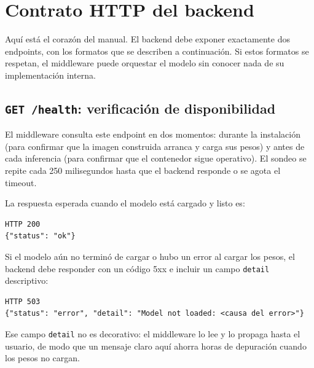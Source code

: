 \documentclass[12pt,a4paper]{article}
\begin{document}
\section{Contrato HTTP del backend}

Aquí está el corazón del manual. El backend debe exponer exactamente dos endpoints, con los formatos que se describen a continuación. Si estos formatos se respetan, el middleware puede orquestar el modelo sin conocer nada de su implementación interna.

\subsection{\texttt{GET /health}: verificación de disponibilidad}

El middleware consulta este endpoint en dos momentos: durante la instalación (para confirmar que la imagen construida arranca y carga sus pesos) y antes de cada inferencia (para confirmar que el contenedor sigue operativo). El sondeo se repite cada 250 milisegundos hasta que el backend responde o se agota el timeout.

La respuesta esperada cuando el modelo está cargado y listo es:

\begin{center}
\begin{minipage}{0.9\textwidth}
\small
\begin{Verbatim}[baselinestretch=0.9]
HTTP 200
{"status": "ok"}
\end{Verbatim}
\end{minipage}
\end{center}

Si el modelo aún no terminó de cargar o hubo un error al cargar los pesos, el backend debe responder con un código 5xx e incluir un campo \texttt{detail} descriptivo:

\begin{center}
\begin{minipage}{0.9\textwidth}
\small
\begin{Verbatim}[baselinestretch=0.9]
HTTP 503
{"status": "error", "detail": "Model not loaded: <causa del error>"}
\end{Verbatim}
\end{minipage}
\end{center}

Ese campo \texttt{detail} no es decorativo: el middleware lo lee y lo propaga hasta el usuario, de modo que un mensaje claro aquí ahorra horas de depuración cuando los pesos no cargan.
\end{document}
